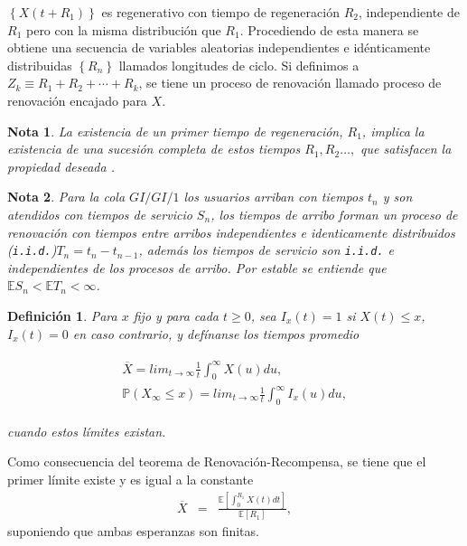 \documentclass{article}
\newtheorem{Def}{Definición}[section]
\newtheorem{Note}{Nota}[section]
\newcommand{\esp}{\mathbb{E}}
\newcommand{\prob}{\mathbb{P}}
\numberwithin{equation}{section}
\begin{document}
$\left\{X\left(t+R_{1}\right)\right\}$ es regenerativo con tiempo de regeneraci\'on $R_{2}$, independiente de $R_{1}$ pero con la misma distribuci\'on que $R_{1}$. Procediendo de esta manera se obtiene una secuencia de variables aleatorias independientes e id\'enticamente distribuidas $\left\{R_{n}\right\}$ llamados longitudes de ciclo. Si definimos a $Z_{k}\equiv R_{1}+R_{2}+\cdots+R_{k}$, se tiene un proceso de renovaci\'on llamado proceso de renovaci\'on encajado para $X$.


\begin{Note}
La existencia de un primer tiempo de regeneraci\'on, $R_{1}$, implica la existencia de una sucesi\'on completa de estos tiempos $R_{1},R_{2}\ldots,$ que satisfacen la propiedad deseada \cite{Sigman2}.
\end{Note}


\begin{Note} Para la cola $GI/GI/1$ los usuarios arriban con tiempos $t_{n}$ y son atendidos con tiempos de servicio $S_{n}$, los tiempos de arribo forman un proceso de renovaci\'on  con tiempos entre arribos independientes e identicamente distribuidos (\texttt{i.i.d.})$T_{n}=t_{n}-t_{n-1}$, adem\'as los tiempos de servicio son \texttt{i.i.d.} e independientes de los procesos de arribo. Por \textit{estable} se entiende que $\esp S_{n}<\esp T_{n}<\infty$.
\end{Note}
 

\begin{Def}
Para $x$ fijo y para cada $t\geq0$, sea $I_{x}\left(t\right)=1$ si $X\left(t\right)\leq x$,  $I_{x}\left(t\right)=0$ en caso contrario, y def\'inanse los tiempos promedio

\begin{eqnarray}
\begin{array}{l}
\overline{X}=lim_{t\rightarrow\infty}\frac{1}{t}\int_{0}^{\infty}X\left(u\right)du,\\
\prob\left(X_{\infty}\leq x\right)=lim_{t\rightarrow\infty}\frac{1}{t}\int_{0}^{\infty}I_{x}\left(u\right)du,
\end{array}
\end{eqnarray}

cuando estos l\'imites existan.
\end{Def}

Como consecuencia del teorema de Renovaci\'on-Recompensa, se tiene que el primer l\'imite  existe y es igual a la constante
\begin{eqnarray}
\overline{X}&=&\frac{\esp\left[\int_{0}^{R_{1}}X\left(t\right)dt\right]}{\esp\left[R_{1}\right]},
\end{eqnarray}
suponiendo que ambas esperanzas son finitas.
\end{document}
